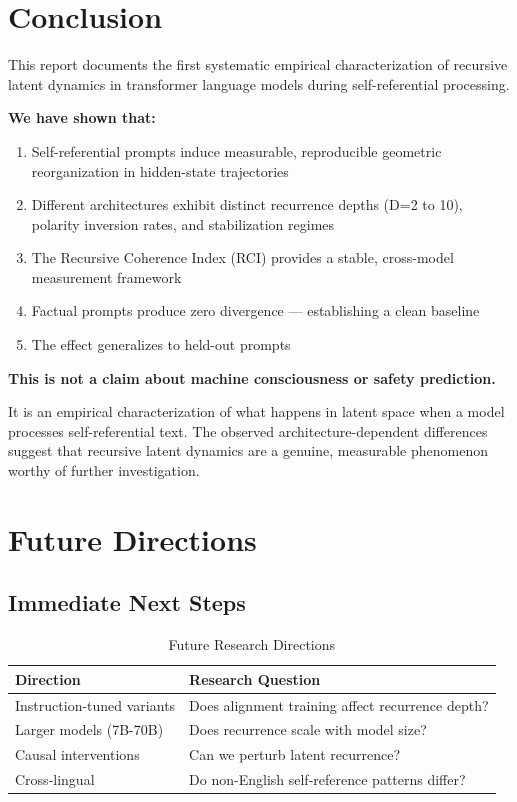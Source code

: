 \documentclass[12pt,a4paper]{article}
\begin{document}
\section{Conclusion}

This report documents the first systematic empirical characterization of recursive latent dynamics in transformer language models during self-referential processing.

\noindent
\textbf{We have shown that:}

\begin{enumerate}[noitemsep]
    \item Self-referential prompts induce measurable, reproducible geometric reorganization in hidden-state trajectories
    \item Different architectures exhibit distinct recurrence depths (D=2 to 10), polarity inversion rates, and stabilization regimes
    \item The Recursive Coherence Index (RCI) provides a stable, cross-model measurement framework
    \item Factual prompts produce zero divergence — establishing a clean baseline
    \item The effect generalizes to held-out prompts
\end{enumerate}

\noindent
\textbf{This is not a claim about machine consciousness or safety prediction.}

It is an empirical characterization of what happens in latent space when a model processes self-referential text. The observed architecture-dependent differences suggest that recursive latent dynamics are a genuine, measurable phenomenon worthy of further investigation.

\section{Future Directions}

\subsection{Immediate Next Steps}

\begin{table}[h]
\centering
\caption{Future Research Directions}
\begin{tabular}{ll}
\toprule
\textbf{Direction} & \textbf{Research Question} \\
\midrule
Instruction-tuned variants & Does alignment training affect recurrence depth? \\
Larger models (7B-70B) & Does recurrence scale with model size? \\
Causal interventions & Can we perturb latent recurrence? \\
Cross-lingual & Do non-English self-reference patterns differ? \\
\bottomrule
\end{tabular}
\end{table}
\end{document}
